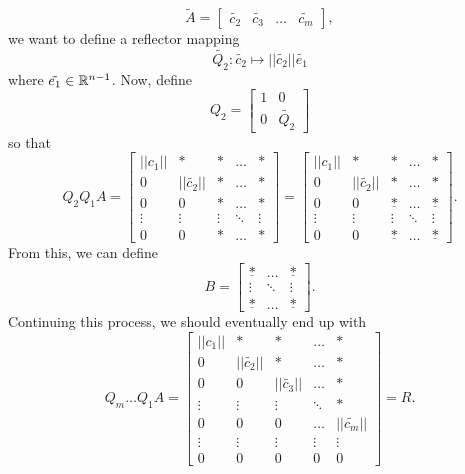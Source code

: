 \documentclass[letterpaper]{article}
\newcommand{\0}{\mathbf{0}}
\begin{document}
\[\tilde{A} = \begin{bmatrix}
    \tilde{c_2} & \tilde{c_3} & \hdots & \tilde{c_m}
\end{bmatrix},\] we want to define a reflector mapping \[\tilde{Q_2}: \tilde{c_2} \mapsto ||\tilde{c_2}|| \tilde{e_1}\] where $\tilde{e_1} \in \mathbb{R}^{n - 1}$. Now, define \[Q_2 = \begin{bmatrix}
    1 & 0 \\ 
    0 & \tilde{Q_2}
\end{bmatrix}\] so that \[Q_2 Q_1 A = \begin{bmatrix}
    ||c_1|| & * & * & \hdots & * \\ 
    0 & ||\tilde{c_2}|| & * & \hdots & * \\ 
    0 & 0 & * & \hdots & * \\
    \vdots & \vdots & \vdots & \ddots & \vdots \\ 
    0 & 0 & * & \hdots & *
\end{bmatrix} = \begin{bmatrix}
    ||c_1|| & * & * & \hdots & * \\ 
    0 & ||\tilde{c_2}|| & * & \hdots & * \\ 
    0 & 0 & \underline{*} & \hdots & \underline{*} \\
    \vdots & \vdots & \vdots & \ddots & \vdots \\ 
    0 & 0 & \underline{*} & \hdots & \underline{*}
\end{bmatrix}.\] From this, we can define \[B = \begin{bmatrix}
    \underline{*} & \hdots & \underline{*} \\ 
    \vdots & \ddots & \vdots \\ 
    \underline{*} & \hdots & \underline{*}
\end{bmatrix}.\] Continuing this process, we should eventually end up with \[Q_m \hdots Q_1 A = \begin{bmatrix}
    ||c_1|| & * & * & \hdots & * \\ 
    0       & ||\tilde{c_2}|| & * & \hdots & * \\ 
    0       & 0               & ||\tilde{c_3}|| & \hdots & * \\ 
    \vdots  & \vdots          & \vdots          & \ddots & * \\ 
    0       & 0               & 0               & \hdots & ||\tilde{c_m}|| \\ 
    \vdots  & \vdots          & \vdots          & \vdots & \vdots \\ 
    0 & 0 & 0 & 0 & 0
\end{bmatrix} = R.\]
\end{document}
